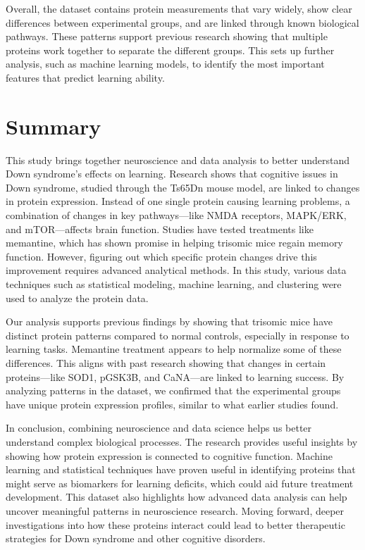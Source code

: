 \documentclass[a4paper,12pt]{article}
\begin{document}
Overall, the dataset contains protein measurements that vary widely, show clear differences between experimental groups, and are linked through known biological pathways. These patterns support previous research showing that multiple proteins work together to separate the different groups. This sets up further analysis, such as machine learning models, to identify the most important features that predict learning ability.


\section{Summary}
This study brings together neuroscience and data analysis to better understand Down syndrome’s effects on learning. Research shows that cognitive issues in Down syndrome, studied through the Ts65Dn mouse model, are linked to changes in protein expression. Instead of one single protein causing learning problems, a combination of changes in key pathways—like NMDA receptors, MAPK/ERK, and mTOR—affects brain function. Studies have tested treatments like memantine, which has shown promise in helping trisomic mice regain memory function. However, figuring out which specific protein changes drive this improvement requires advanced analytical methods. In this study, various data techniques such as statistical modeling, machine learning, and clustering were used to analyze the protein data. 

Our analysis supports previous findings by showing that trisomic mice have distinct protein patterns compared to normal controls, especially in response to learning tasks. Memantine treatment appears to help normalize some of these differences. This aligns with past research showing that changes in certain proteins—like SOD1, pGSK3B, and CaNA—are linked to learning success. By analyzing patterns in the dataset, we confirmed that the experimental groups have unique protein expression profiles, similar to what earlier studies found.

In conclusion, combining neuroscience and data science helps us better understand complex biological processes. The research provides useful insights by showing how protein expression is connected to cognitive function. Machine learning and statistical techniques have proven useful in identifying proteins that might serve as biomarkers for learning deficits, which could aid future treatment development. This dataset also highlights how advanced data analysis can help uncover meaningful patterns in neuroscience research. Moving forward, deeper investigations into how these proteins interact could lead to better therapeutic strategies for Down syndrome and other cognitive disorders.


    
%


\end{document}
